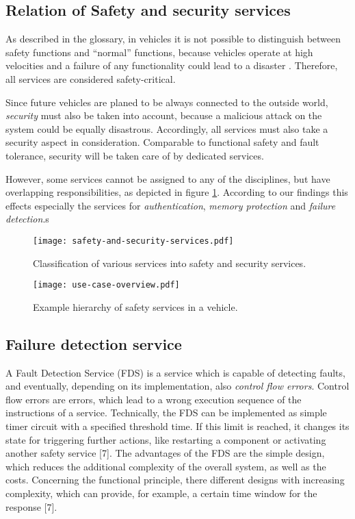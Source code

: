 \subsection{Relation of Safety and security services}

As described in the glossary, in vehicles it is not possible to distinguish between safety functions and ``normal'' functions, because vehicles operate at high velocities and a failure of any functionality could lead to a disaster \cite{iso26262:course2}. Therefore, all services are considered safety-critical.

Since future vehicles are planed to be always connected to the outside world, \emph{security} must also be taken into account, because a malicious attack on the system could be equally disastrous. Accordingly, all services must also take a security aspect in consideration. Comparable to functional safety and fault tolerance, security will be taken care of by dedicated services.

However, some services cannot be assigned to any of the disciplines, but have overlapping responsibilities, as depicted in figure \ref{fig:safety-and-security-services}. According to our findings this effects especially the services for \emph{authentication}, \emph{memory protection} and \emph{failure detection}.s

\begin{figure}[ht]
\centering
\texttt{[image: safety-and-security-services.pdf]}
\caption{Classification of various services into safety and security services.}
\label{fig:safety-and-security-services}
\end{figure}

\begin{figure}[ht]
\centering
\texttt{[image: use-case-overview.pdf]}
\caption{Example hierarchy of safety services in a vehicle.}
\label{fig:safety-services}
\end{figure}




\subsection{Failure detection service}

A Fault Detection Service (FDS) is a service which is capable of detecting faults, and eventually, depending on its implementation, also \emph{control flow errors}. Control flow errors are errors, which lead to a wrong execution sequence of the instructions of a service.
Technically, the FDS can be implemented as simple timer circuit with a specified threshold time. If this limit is reached, it changes its state for triggering further actions, like restarting a component or activating another safety service [7].
The advantages of the FDS are the simple design, which reduces the additional complexity of the overall system, as well as the costs. Concerning the functional principle, there different designs with increasing complexity, which can provide, for example, a certain time window for the response [7].


